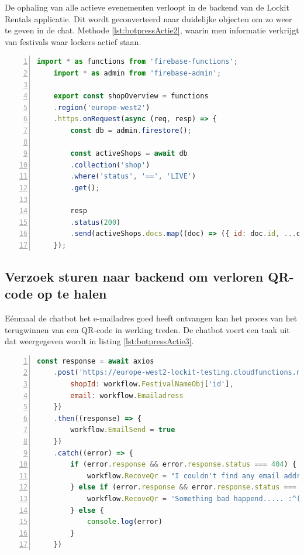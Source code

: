 De ophaling van alle actieve evenementen verloopt in de backend van de Lockit Rentals applicatie. Dit wordt geconverteerd naar duidelijke objecten om zo weer te geven in de chat.
Methode \ref{lst:botpressActie2}, waarin men informatie verkrijgt van festivals waar lockers actief staan.
\begin{lstlisting}[language=JavaScript, caption={Methode waarin festivals worden ogpehaald waar lockers actie zijn.}, label=lst:botpressActie2, numbers=left]
    import * as functions from 'firebase-functions';
    import * as admin from 'firebase-admin';
    
    export const shopOverview = functions
    .region('europe-west2')
    .https.onRequest(async (req, resp) => {
        const db = admin.firestore();
        
        const activeShops = await db
        .collection('shop')
        .where('status', '==', 'LIVE')
        .get();
        
        resp
        .status(200)
        .send(activeShops.docs.map((doc) => ({ id: doc.id, ...doc.data() })));
    });
\end{lstlisting}

\subsection{Verzoek sturen naar backend om verloren QR-code op te halen}
\label{versturenRequestEmail}

Eénmaal de chatbot het e-mailadres goed heeft ontvangen kan het proces van het terugwinnen van een QR-code in werking treden. De chatbot voert een taak uit dat weergegeven wordt in listing \ref{lst:botpressActie3}. 

\begin{lstlisting}[language=JavaScript, caption={Een blok uitvoerbare code geschreven in javascript in een actie van Botpress. Deze code zal een verzoek uitsturen en het antwoord hiervan capteren.}, label=lst:botpressActie3, numbers=left]
    const response = await axios
    .post('https://europe-west2-lockit-testing.cloudfunctions.net/recoverLostCode', {
        shopId: workflow.FestivalNameObj['id'],
        email: workflow.Emailadress
    })
    .then((response) => {
        workflow.EmailSend = true
    })
    .catch((error) => {
        if (error.response && error.response.status === 404) {
            workflow.RecoveQr = "I couldn't find any email address associated with a purchased QR code. Please try again."
        } else if (error.response && error.response.status === 500) {
            workflow.RecoveQr = 'Something bad happend..... :^('
        } else {
            console.log(error)
        }
    })
\end{lstlisting}


